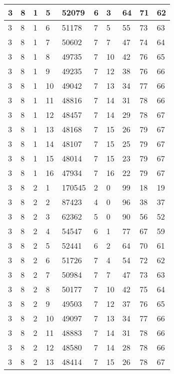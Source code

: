 \begin{table}[!ht]
\begin{tabular}{|l|l|l|l|l|l|l|l|l|l|}
        3 & 8 & 1 & 5 & 52079 & 6 & 3 & 64 & 71 & 62 \\ \hline
        3 & 8 & 1 & 6 & 51178 & 7 & 5 & 55 & 73 & 63 \\ \hline
        3 & 8 & 1 & 7 & 50602 & 7 & 7 & 47 & 74 & 64 \\ \hline
        3 & 8 & 1 & 8 & 49735 & 7 & 10 & 42 & 76 & 65 \\ \hline
        3 & 8 & 1 & 9 & 49235 & 7 & 12 & 38 & 76 & 66 \\ \hline
        3 & 8 & 1 & 10 & 49042 & 7 & 13 & 34 & 77 & 66 \\ \hline
        3 & 8 & 1 & 11 & 48816 & 7 & 14 & 31 & 78 & 66 \\ \hline
        3 & 8 & 1 & 12 & 48457 & 7 & 14 & 29 & 78 & 67 \\ \hline
        3 & 8 & 1 & 13 & 48168 & 7 & 15 & 26 & 79 & 67 \\ \hline
        3 & 8 & 1 & 14 & 48107 & 7 & 15 & 25 & 79 & 67 \\ \hline
        3 & 8 & 1 & 15 & 48014 & 7 & 15 & 23 & 79 & 67 \\ \hline
        3 & 8 & 1 & 16 & 47934 & 7 & 16 & 22 & 79 & 67 \\ \hline
        3 & 8 & 2 & 1 & 170545 & 2 & 0 & 99 & 18 & 19 \\ \hline
        3 & 8 & 2 & 2 & 87423 & 4 & 0 & 96 & 38 & 37 \\ \hline
        3 & 8 & 2 & 3 & 62362 & 5 & 0 & 90 & 56 & 52 \\ \hline
        3 & 8 & 2 & 4 & 54547 & 6 & 1 & 77 & 67 & 59 \\ \hline
        3 & 8 & 2 & 5 & 52441 & 6 & 2 & 64 & 70 & 61 \\ \hline
        3 & 8 & 2 & 6 & 51726 & 7 & 4 & 54 & 72 & 62 \\ \hline
        3 & 8 & 2 & 7 & 50984 & 7 & 7 & 47 & 73 & 63 \\ \hline
        3 & 8 & 2 & 8 & 50177 & 7 & 10 & 42 & 75 & 64 \\ \hline
        3 & 8 & 2 & 9 & 49503 & 7 & 12 & 37 & 76 & 65 \\ \hline
        3 & 8 & 2 & 10 & 49097 & 7 & 13 & 34 & 77 & 66 \\ \hline
        3 & 8 & 2 & 11 & 48883 & 7 & 14 & 31 & 78 & 66 \\ \hline
        3 & 8 & 2 & 12 & 48580 & 7 & 14 & 28 & 78 & 66 \\ \hline
        3 & 8 & 2 & 13 & 48414 & 7 & 15 & 26 & 78 & 67 \\ \hline

\end{tabular}
\end{table}
